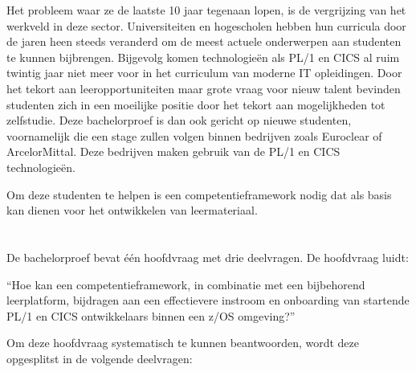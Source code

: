Het probleem waar ze de laatste 10 jaar tegenaan lopen, is de vergrijzing van het werkveld in deze sector.
Universiteiten en hogescholen hebben hun curricula door de jaren heen steeds veranderd om de meest actuele onderwerpen aan studenten te kunnen bijbrengen.
Bijgevolg komen technologieën als PL/1 en CICS al ruim twintig jaar niet meer voor in het curriculum van moderne IT opleidingen.
Door het tekort aan leeropportuniteiten maar grote vraag voor nieuw talent bevinden studenten zich in een moeilijke positie door het tekort aan mogelijkheden tot zelfstudie.
Deze bachelorproef is dan ook gericht op nieuwe studenten, voornamelijk die een stage zullen volgen binnen bedrijven zoals Euroclear of ArcelorMittal.
Deze bedrijven maken gebruik van de PL/1 en CICS technologieën.

Om deze studenten te helpen is een competentieframework nodig dat als basis kan dienen voor het ontwikkelen van leermateriaal.


\section{}%
\label{sec:onderzoeksvraag}

De bachelorproef bevat één hoofdvraag met drie deelvragen. De hoofdvraag luidt:

“Hoe kan een competentieframework, in combinatie met een bijbehorend leerplatform, bijdragen aan een effectievere instroom en onboarding van startende PL/1 en CICS ontwikkelaars binnen een z/OS omgeving?”

Om deze hoofdvraag systematisch te kunnen beantwoorden, wordt deze opgesplitst in de volgende deelvragen:


